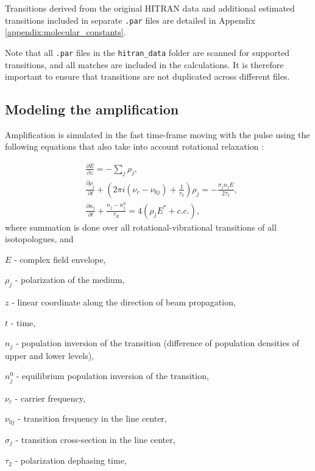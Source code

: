 Transitions derived from the original HITRAN data and additional estimated transitions included in separate \texttt{.par} files are detailed in Appendix \ref{appendix:molecular_constants}.

Note that all \texttt{.par} files in the \texttt{hitran\_data} folder are scanned for supported transitions, and all matches are included in the calculations. It is therefore important to ensure that transitions are not duplicated across different files.



\subsection{Modeling the amplification}
Amplification is simulated in the fast time-frame moving with the pulse using the following equations that also take into account rotational relaxation \cite{Feldman-1973,Volkin-1979}:

\begin{equation}\label{eq:amplification}
\begin{aligned}
&\frac{\partial E}{\partial z} =  - \sum\limits_j {\rho _j},\\
&\frac{\partial \rho _j}{\partial t} + \left(2\pi i(\nu _c-\nu _{0j}) + \frac{1}{\tau_2} \right)\rho _j =  - \frac{\sigma _j n_j E}{2\tau_2},\\
&\frac{\partial n_j}{\partial t} + \frac{n_j-n_j^0}{\tau _R} = 4(\rho _j E^* + c.c.),
\end{aligned}
\end{equation}
where summation is done over all rotational-vibrational transitions of all  isotopologues, and

$E$ - complex field envelope,

$\rho_j$ - polarization of the medium,

$z$ - linear coordinate along the direction of beam propagation,

$t$ - time,

$n_j$ - population inversion of the transition (difference of population densities of upper and lower levels),

$n_j^0$ - equilibrium population inversion of the transition,

$\nu _c$ - carrier frequency,

$\nu_{0j}$ - transition frequency in the line center,

$\sigma_j$ - transition cross-section in the line center,

$\tau_2$ - polarization dephasing time,

